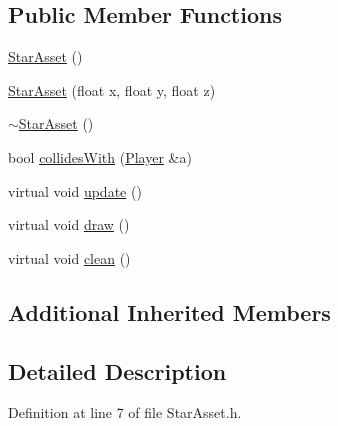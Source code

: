 \subsection*{Public Member Functions}
\begin{DoxyCompactItemize}
\item 
\hyperlink{classStarAsset_a256d7fef7a77f48eab4af886b2411959}{Star\-Asset} ()
\item 
\hyperlink{classStarAsset_a3dae8c8b498f6029b033aa172f555865}{Star\-Asset} (float x, float y, float z)
\item 
\hyperlink{classStarAsset_a77a07269f87ab84c206d1bc5733e0a10}{$\sim$\-Star\-Asset} ()
\item 
bool \hyperlink{classStarAsset_a359a29db9eaf03058af02bf3bf1d0263}{collides\-With} (\hyperlink{classPlayer}{Player} \&a)
\item 
virtual void \hyperlink{classStarAsset_a21f6e7f632408f34209db35d41f41877}{update} ()
\item 
virtual void \hyperlink{classStarAsset_a0ebfee331ac06d5e58ee0226104ac4e2}{draw} ()
\item 
virtual void \hyperlink{classStarAsset_a0e0f4afbd0edd0d10b7e4a2810222c66}{clean} ()
\end{DoxyCompactItemize}
\subsection*{Additional Inherited Members}


\subsection{Detailed Description}


Definition at line 7 of file Star\-Asset.\-h.




